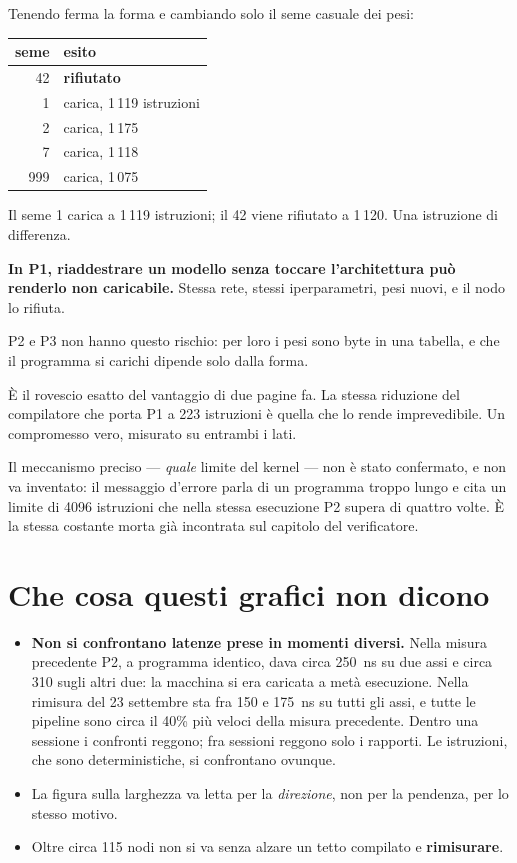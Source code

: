 \documentclass[11pt,a4paper,oneside]{report}
\begin{document}
Tenendo ferma la forma e cambiando solo il seme casuale dei pesi:

\begin{center}
\small
\begin{tabular}{@{}rl@{}}
\toprule
\textbf{seme} & \textbf{esito} \\
\midrule
42  & \textcolor{bad}{\textbf{rifiutato}} \\
1   & carica, 1\,119 istruzioni \\
2   & carica, 1\,175 \\
7   & carica, 1\,118 \\
999 & carica, 1\,075 \\
\bottomrule
\end{tabular}
\end{center}

Il seme 1 carica a 1\,119 istruzioni; il 42 viene rifiutato a 1\,120. Una
istruzione di differenza.

\begin{lezione}
\textbf{In P1, riaddestrare un modello senza toccare l'architettura può renderlo
non caricabile.} Stessa rete, stessi iperparametri, pesi nuovi, e il nodo lo
rifiuta.

P2 e P3 non hanno questo rischio: per loro i pesi sono byte in una tabella, e
che il programma si carichi dipende solo dalla forma.
\end{lezione}

È il rovescio esatto del vantaggio di due pagine fa. La stessa riduzione del
compilatore che porta P1 a 223 istruzioni è quella che lo rende imprevedibile.
Un compromesso vero, misurato su entrambi i lati.

Il meccanismo preciso --- \emph{quale} limite del kernel --- non è stato
confermato, e non va inventato: il messaggio d'errore parla di un programma
troppo lungo e cita un limite di 4096 istruzioni che nella stessa esecuzione P2
supera di quattro volte. È la stessa costante morta già incontrata sul capitolo
del verificatore.

\section{Che cosa questi grafici non dicono}

\begin{itemize}
\item \textbf{Non si confrontano latenze prese in momenti diversi.} Nella
      misura precedente P2, a programma identico, dava circa 250~ns su due assi e
      circa 310 sugli altri due: la macchina si era caricata a metà esecuzione.
      Nella rimisura del 23 settembre sta fra 150 e 175~ns su tutti gli assi, e
      tutte le pipeline sono circa il 40\% più veloci della misura precedente.
      Dentro una sessione i confronti reggono; fra sessioni reggono solo i
      rapporti. Le istruzioni, che sono deterministiche, si confrontano ovunque.
\item La figura sulla larghezza va letta per la \emph{direzione}, non per la
      pendenza, per lo stesso motivo.
\item Oltre circa 115 nodi non si va senza alzare un tetto compilato e
      \textbf{rimisurare}.
\end{itemize}
\end{document}
